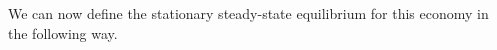 %
%

    We can now define the stationary steady-state equilibrium for this economy in the following way.

   \ \\
   
